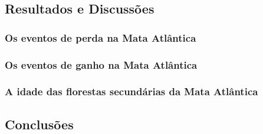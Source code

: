 \documentclass[12pt,a4paper]{article}
\begin{document}

\subsection{Resultados e Discussões}

\subsubsection{Os eventos de perda na Mata Atlântica}
\subsubsection{Os eventos de ganho na Mata Atlântica}
\subsubsection{A idade das florestas secundárias da Mata Atlântica}

\subsection{Conclusões}

\newpage

%

\end{document}
